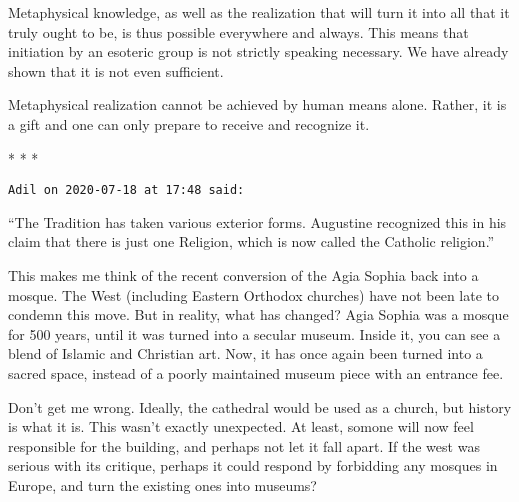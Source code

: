 Metaphysical knowledge, as well as the realization that will turn it into all that it truly ought to be, is thus possible everywhere and always. This means that initiation by an esoteric group is not strictly speaking necessary. We have already shown that it is not even sufficient.

Metaphysical realization cannot be achieved by human means alone. Rather, it is a gift and one can only prepare to receive and recognize it.




\begin{center}* * *\end{center}

\begin{footnotesize}\begin{sffamily}



\texttt{Adil on 2020-07-18 at 17:48 said: }

“The Tradition has taken various exterior forms. Augustine recognized this in his claim that there is just one Religion, which is now called the Catholic religion.”

This makes me think of the recent conversion of the Agia Sophia back into a mosque. The West (including Eastern Orthodox churches) have not been late to condemn this move. But in reality, what has changed? Agia Sophia was a mosque for 500 years, until it was turned into a secular museum. Inside it, you can see a blend of Islamic and Christian art. Now, it has once again been turned into a sacred space, instead of a poorly maintained museum piece with an entrance fee.

Don't get me wrong. Ideally, the cathedral would be used as a church, but history is what it is. This wasn't exactly unexpected. At least, somone will now feel responsible for the building, and perhaps not let it fall apart. If the west was serious with its critique, perhaps it could respond by forbidding any mosques in Europe, and turn the existing ones into museums?


\end{sffamily}\end{footnotesize}
